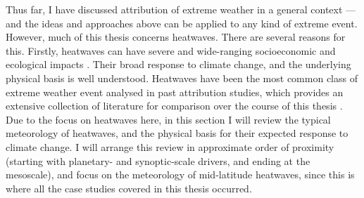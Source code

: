   Thus far, I have discussed attribution of extreme weather in a general context --- and the ideas and approaches above can be applied to any kind of extreme event. However, much of this thesis concerns heatwaves. There are several reasons for this. Firstly, heatwaves can have severe and wide-ranging socioeconomic and ecological impacts \citep{mitchell_attributing_2016,lo_estimating_2022,schauberger_consistent_2017,davis_arabica-like_2021}. Their broad response to climate change, and the underlying physical basis is well understood. Heatwaves have been the most common class of extreme weather event analysed in past attribution studies, which provides an extensive collection of literature for comparison over the course of this thesis \citep{noauthor_mapped_2021}. Due to the focus on heatwaves here, in this section I will review the typical meteorology of heatwaves, and the physical basis for their expected response to climate change. I will arrange this review in approximate order of proximity (starting with planetary- and synoptic-scale drivers, and ending at the mesoscale), and focus on the meteorology of mid-latitude heatwaves, since this is where all the case studies covered in this thesis occurred.

